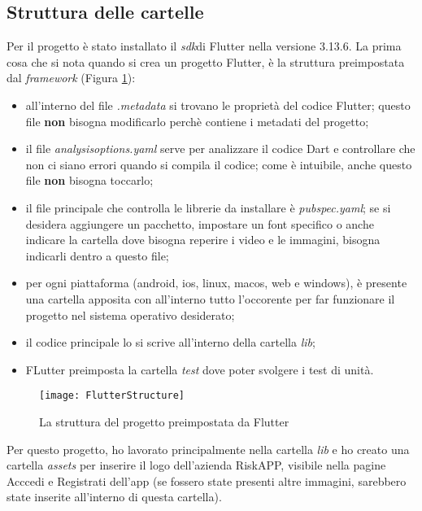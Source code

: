 \subsection{Struttura delle cartelle}
Per il progetto è stato installato il \emph{\gls{sdk}}\glsfirstoccur di Flutter nella versione 3.13.6.\newline  
\newline
La prima cosa che si nota quando si crea un progetto Flutter, è la struttura preimpostata dal \emph{framework} (Figura \ref{fig:directory-flutter}):
\begin{itemize}
    \item all'interno del file \emph{.metadata} si trovano le proprietà del codice Flutter; questo file \textbf{non} bisogna modificarlo perchè contiene i metadati del progetto;
    \item il file \emph{analysis\textunderscore options.yaml} serve per analizzare il codice Dart e controllare che non ci siano errori quando si compila il codice; come è intuibile, anche questo file \textbf{non} bisogna toccarlo;
    \item il file principale che controlla le librerie da installare è \emph{pubspec.yaml}; se si desidera aggiungere un pacchetto, impostare un font specifico o anche indicare la cartella dove bisogna reperire i video e le immagini, bisogna indicarli dentro a questo file;
    \item per ogni piattaforma (android, ios, linux, macos, web e windows), è presente una cartella apposita con all'interno tutto l'occorente per far funzionare il progetto nel sistema operativo desiderato;
    \item il codice principale lo si scrive all'interno della cartella \emph{lib};
    \item FLutter preimposta la cartella \emph{test} dove poter svolgere i test di unità.
\end{itemize}
\begin{figure}[!h] 
    \centering 
    \texttt{[image: FlutterStructure]} 
    \caption{La struttura del progetto preimpostata da Flutter}
    \label{fig:directory-flutter}
\end{figure}
Per questo progetto, ho lavorato principalmente nella cartella \emph{lib} e ho creato una cartella \emph{assets} per inserire il logo dell'azienda RiskAPP, visibile nella pagine Acccedi e Registrati dell'app (se fossero state presenti altre immagini, sarebbero state inserite all'interno di questa cartella).\newline
